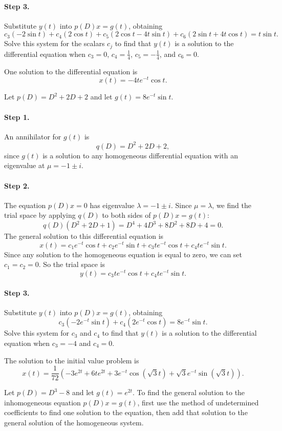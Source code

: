 \paragraph{Step 3.} Substitute $y(t)$ into $p(D)x = g(t)$, obtaining
\[
c_3(-2\sin t) + c_4(2\cos t) + c_5(2\cos t - 4t\sin t) +
c_6(2\sin t + 4t\cos t) = t\sin t.
\]
Solve this system for the scalars $c_j$ to find that $y(t)$ is a solution
to the differential equation when $c_3 = 0$, $c_4 = \frac{1}{4}$,
$c_5 = -\frac{1}{4}$, and $c_6 = 0$.

 \ans One solution to the differential equation is
\[
x(t) = -4te^{-t}\cos t.
\]

\soln Let $p(D) = D^2 + 2D + 2$ and let $g(t) = 8e^{-t}\sin t$.
\paragraph{Step 1.} An annihilator for $g(t)$ is
\[
q(D) = D^2 + 2D + 2,
\]
since $g(t)$ is a solution to any homogeneous differential equation
with an eigenvalue at $\mu = -1 \pm i$.

\paragraph{Step 2.} The equation $p(D)x = 0$ has eigenvalue
$\lambda = -1 \pm i$.  Since $\mu = \lambda$, we find the trial space
by applying $q(D)$ to both sides of $p(D)x = g(t)$:
\[
q(D)(D^2 + 2D + 1) = D^4 + 4D^3 + 8D^2 + 8D + 4	= 0.
\]
The general solution to this differential equation is
\[
x(t) = c_1e^{-t}\cos t + c_2e^{-t}\sin t + c_3te^{-t}\cos t +
c_4te^{-t}\sin t.
\]
Since any solution to the homogeneous equation is equal to zero, we can
set $c_1 = c_2 = 0$.  So the trial space is
\[
y(t) = c_3te^{-t}\cos t + c_4te^{-t}\sin t.
\]
\paragraph{Step 3.} Substitute $y(t)$ into $p(D)x = g(t)$, obtaining
\[
c_3(-2e^{-t}\sin t) + c_4(2e^{-t}\cos t) = 8e^{-t}\sin t.
\]
Solve this system for $c_3$ and $c_4$ to find that $y(t)$ is a solution
to the differential equation when $c_3 = -4$ and $c_4 = 0$.

 \ans The solution to the initial value problem is
\[
x(t) = \frac{1}{72}(-3e^{2t} + 6te^{2t} + 3e^{-t}\cos(\sqrt{3}t)
+ \sqrt{3}e^{-t}\sin(\sqrt{3}t)).
\]

\soln Let $p(D) = D^3 - 8$ and let $g(t) = e^{2t}$.  To find the general
solution to the inhomogeneous equation $p(D)x = g(t)$, first use the
method of undetermined coefficients to find one solution to the
equation, then add that solution to the general solution of the
homogeneous system.

